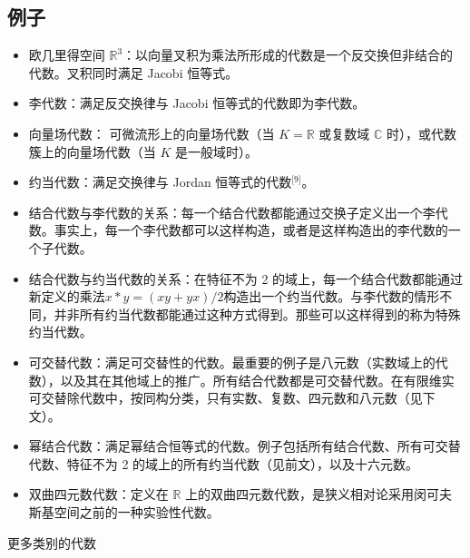 \subsection{例子}
\begin{itemize}
\item 欧几里得空间 $\mathbb{R}^3$：以向量叉积为乘法所形成的代数是一个反交换但非结合的代数。叉积同时满足 Jacobi 恒等式。
\item 李代数：满足反交换律与 Jacobi 恒等式的代数即为李代数。
\item 向量场代数：
  可微流形上的向量场代数（当 $K=\mathbb{R}$ 或复数域 $\mathbb{C}$ 时），或代数簇上的向量场代数（当 $K$ 是一般域时）。
\item 约当代数：满足交换律与 Jordan 恒等式的代数\(^\text{[9]}\)。
\item 结合代数与李代数的关系：每一个结合代数都能通过交换子定义出一个李代数。事实上，每一个李代数都可以这样构造，或者是这样构造出的李代数的一个子代数。
\item 结合代数与约当代数的关系：在特征不为 2 的域上，每一个结合代数都能通过新定义的乘法$x * y = (xy + yx)/2$构造出一个约当代数。与李代数的情形不同，并非所有约当代数都能通过这种方式得到。那些可以这样得到的称为特殊约当代数。
\item 可交替代数：满足可交替性的代数。最重要的例子是八元数（实数域上的代数），以及其在其他域上的推广。所有结合代数都是可交替代数。在有限维实可交替除代数中，按同构分类，只有实数、复数、四元数和八元数（见下文）。
\item 幂结合代数：满足幂结合恒等式的代数。例子包括所有结合代数、所有可交替代数、特征不为 2 的域上的所有约当代数（见前文），以及十六元数。
\item 双曲四元数代数：定义在 $\mathbb{R}$ 上的双曲四元数代数，是狭义相对论采用闵可夫斯基空间之前的一种实验性代数。
\end{itemize}
更多类别的代数
